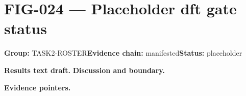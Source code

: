 \clearpage
\section{FIG-024 --- Placeholder dft gate status}
\label{figpage:fig-024}
\textbf{Group:} TASK2-ROSTER\quad \textbf{Evidence chain:} manifested\quad \textbf{Status:} placeholder

\textbf{Results text draft.} 
\textbf{Discussion and boundary.} 


\textbf{Evidence pointers.}



\vfill
